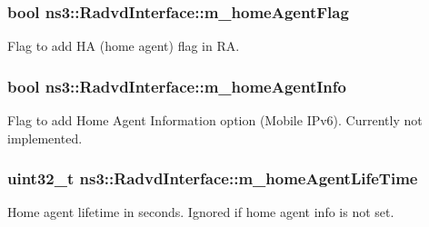 \subsubsection[{\texorpdfstring{m\+\_\+home\+Agent\+Flag}{m_homeAgentFlag}}]{\setlength{\rightskip}{0pt plus 5cm}bool ns3\+::\+Radvd\+Interface\+::m\+\_\+home\+Agent\+Flag\hspace{0.3cm}{\ttfamily [private]}}\hypertarget{classns3_1_1RadvdInterface_abd286a6408ad7936f6241eabd13379be}{}\label{classns3_1_1RadvdInterface_abd286a6408ad7936f6241eabd13379be}


Flag to add HA (home agent) flag in RA. 

\subsubsection[{\texorpdfstring{m\+\_\+home\+Agent\+Info}{m_homeAgentInfo}}]{\setlength{\rightskip}{0pt plus 5cm}bool ns3\+::\+Radvd\+Interface\+::m\+\_\+home\+Agent\+Info\hspace{0.3cm}{\ttfamily [private]}}\hypertarget{classns3_1_1RadvdInterface_a668b3f28b13c42885108599b58140c49}{}\label{classns3_1_1RadvdInterface_a668b3f28b13c42885108599b58140c49}


Flag to add Home Agent Information option (Mobile I\+Pv6). Currently not implemented. 

\subsubsection[{\texorpdfstring{m\+\_\+home\+Agent\+Life\+Time}{m_homeAgentLifeTime}}]{\setlength{\rightskip}{0pt plus 5cm}uint32\+\_\+t ns3\+::\+Radvd\+Interface\+::m\+\_\+home\+Agent\+Life\+Time\hspace{0.3cm}{\ttfamily [private]}}\hypertarget{classns3_1_1RadvdInterface_a69618e1b52b6af3140d9fd8fe98fdd6e}{}\label{classns3_1_1RadvdInterface_a69618e1b52b6af3140d9fd8fe98fdd6e}


Home agent lifetime in seconds. Ignored if home agent info is not set. 

